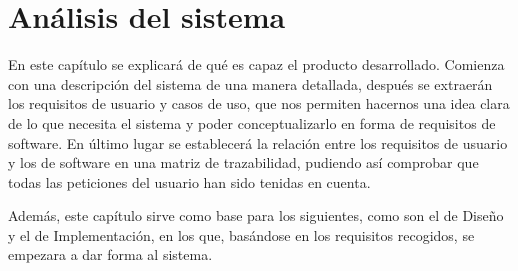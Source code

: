 \chapter{Análisis del sistema}
\label{ch:analisis}
En este capítulo se explicará de qué es capaz el producto desarrollado. Comienza con una descripción del sistema de una manera detallada, después se extraerán los requisitos de usuario y casos de uso, que nos permiten hacernos una idea clara de lo que necesita el sistema y poder conceptualizarlo en forma de requisitos de software. En último lugar se establecerá la relación entre los requisitos de usuario y los de software en una matriz de trazabilidad, pudiendo así comprobar que todas las peticiones del usuario han sido tenidas en cuenta.

Además, este capítulo sirve como base para los siguientes, como son el de Diseño y el de Implementación, en los que, basándose en los requisitos recogidos, se empezara a dar forma al sistema.

